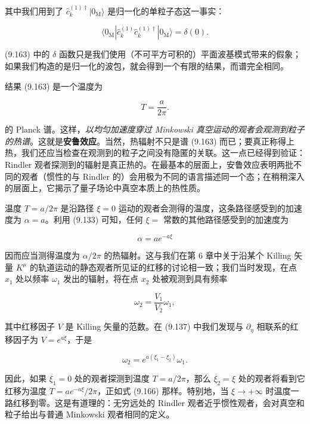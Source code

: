 其中我们用到了 $\hat{c}_{k}^{(1)\dagger}|0_{\mathrm{M}}\rangle$ 是归一化的单粒子态这一事实：

\begin{equation*}
\langle 0_{\mathrm{M}}|\hat{c}_{k}^{(1)}\hat{c}_{k}^{(1)\dagger}|0_{\mathrm{M}}\rangle = \delta(0).
\tag{9.164}
\end{equation*}

(9.163) 中的 $\delta$ 函数只是我们使用（不可平方可积的）平面波基模式带来的假象；如果我们构造的是归一化的波包，就会得到一个有限的结果，而谱完全相同。

结果 (9.163) 是一个温度为

\begin{equation*}
T = \frac{a}{2\pi}.
\tag{9.165}
\end{equation*}

的 Planck 谱。这样，\emph{以均匀加速度穿过 Minkowski 真空运动的观者会观测到粒子的热谱}。这就是\textbf{安鲁效应}。当然，热辐射不只是谱 (9.163) 而已；要真正称得上热，我们还应当检查在观测到的粒子之间没有隐匿的关联。这一点已经得到验证：Rindler 观者探测到的辐射是真正热的。在最基本的层面上，安鲁效应表明两批不同的观者（惯性的与 Rindler 的）会用极为不同的语言描述同一个态；在稍稍深入的层面上，它揭示了量子场论中真空本质上的热性质。

温度 $T=a/2\pi$ 是沿路径 $\xi=0$ 运动的观者会测得的温度，这条路径感受到的加速度为 $\alpha=a$。利用 (9.133) 可知，任何 $\xi=$ 常数的其他路径感受到的加速度为

\begin{equation*}
\alpha = ae^{-a\xi}
\tag{9.166}
\end{equation*}

因而应当测得温度为 $\alpha/2\pi$ 的热辐射。这与我们在第 6 章中关于沿某个 Killing 矢量 $K^{\mu}$ 的轨道运动的静态观者所见证的红移的讨论相一致；我们当时发现，在点 $x_1$ 处以频率 $\omega_1$ 发出的辐射，将在点 $x_2$ 处被观测到具有频率

\begin{equation*}
\omega_2 = \frac{V_1}{V_2}\omega_1,
\tag{9.167}
\end{equation*}

其中红移因子 $V$ 是 Killing 矢量的范数。在 (9.137) 中我们发现与 $\partial_{\eta}$ 相联系的红移因子为 $V=e^{a\xi}$，于是

\begin{equation*}
\omega_2 = e^{a(\xi_1 - \xi_2)}\omega_1.
\tag{9.168}
\end{equation*}

因此，如果 $\xi_1=0$ 处的观者探测到温度 $T=a/2\pi$，那么 $\xi_2=\xi$ 处的观者将看到它红移为温度 $T=ae^{-a\xi}/2\pi$，正如式 (9.166) 那样。特别地，当 $\xi\to+\infty$ 时温度一路红移到零。这是有道理的：无穷远处的 Rindler 观者近乎惯性观者，会对真空和粒子给出与普通 Minkowski 观者相同的定义。

